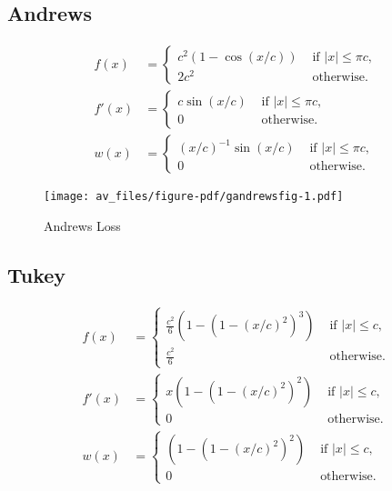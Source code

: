 \documentclass[
  12pt,
  letterpaper,
  DIV=11,
  numbers=noendperiod]{scrartcl}
\theoremstyle{plain}
\theoremstyle{plain}
\theoremstyle{plain}
\theoremstyle{definition}
\theoremstyle{remark}
\begin{document}
\subsection{Andrews}\label{andrews}

\begin{align}
f(x)&=\begin{cases}
c^2(1-\cos(x/c))&\text{ if }|x|\leq\pi c,\\
2c^2&\text{ otherwise.}
\end{cases}\\
f'(x)&=\begin{cases}
c\sin(x/c)&\text{ if }|x|\leq\pi c,\\
0&\text{ otherwise.}
\end{cases}\\
w(x)&=\begin{cases}
(x/c)^{-1}\sin(x/c)&\text{ if }|x|\leq\pi c,\\
0&\text{ otherwise.}
\end{cases}
\end{align}

\begin{figure}[H]

{\centering \texttt{[image: av\_files/figure-pdf/gandrewsfig-1.pdf]}

}

\caption{Andrews Loss}

\end{figure}%

\subsection{Tukey}\label{tukey}

\begin{align}
f(x)&=\begin{cases}
\frac{c^2}{6}\left(1-\left(1-(x/c)^2\right)^3\right)&\text{ if } |x|\leq c,\\
\frac{c^2}{6}&\text{ otherwise}.
\end{cases}\\
f'(x)&=\begin{cases}
x\left(1-\left(1-(x/c)^2\right)^2\right)&\text{ if } |x|\leq c,\\
0&\text{ otherwise}.
\end{cases}\\
w(x)&=\begin{cases}
\left(1-\left(1-(x/c)^2\right)^2\right)&\text{ if } |x|\leq c,\\
0&\text{ otherwise}.
\end{cases}
\end{align}
\end{document}
